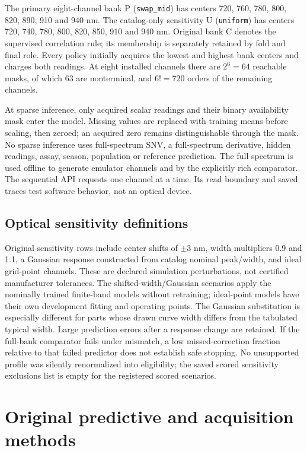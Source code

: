 \documentclass[10pt,a4paper]{article}
\begin{document}
The primary eight-channel bank P (\texttt{swap\_mid}) has centers 720, 760, 780, 800, 820, 890, 910 and 940 nm. The catalog-only sensitivity U (\texttt{uniform}) has centers 720, 740, 780, 800, 820, 850, 910 and 940 nm. Original bank C denotes the supervised correlation rule; its membership is separately retained by fold and final role. Every policy initially acquires the lowest and highest bank centers and charges both readings. At eight installed channels there are $2^6=64$ reachable masks, of which 63 are nonterminal, and $6!=720$ orders of the remaining channels.

At sparse inference, only acquired scalar readings and their binary availability mask enter the model. Missing values are replaced with training means before scaling, then zeroed; an acquired zero remains distinguishable through the mask. No sparse inference uses full-spectrum SNV, a full-spectrum derivative, hidden readings, assay, season, population or reference prediction. The full spectrum is used offline to generate emulator channels and by the explicitly rich comparator. The sequential API requests one channel at a time. Its read boundary and saved traces test software behavior, not an optical device.

\subsection{Optical sensitivity definitions}
Original sensitivity rows include center shifts of $\pm3$ nm, width multipliers 0.9 and 1.1, a Gaussian response constructed from catalog nominal peak/width, and ideal grid-point channels. These are declared simulation perturbations, not certified manufacturer tolerances. The shifted-width/Gaussian scenarios apply the nominally trained finite-band models without retraining; ideal-point models have their own development fitting and operating points. The Gaussian substitution is especially different for parts whose drawn curve width differs from the tabulated typical width. Large prediction errors after a response change are retained. If the full-bank comparator fails under mismatch, a low missed-correction fraction relative to that failed predictor does not establish safe stopping. No unsupported profile was silently renormalized into eligibility; the saved scored sensitivity exclusions list is empty for the registered scored scenarios.

\section{Original predictive and acquisition methods}
\end{document}
